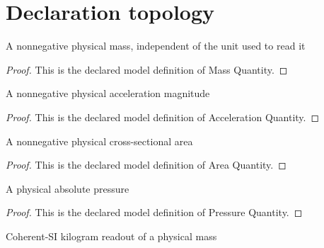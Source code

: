 \section{Declaration topology}
\begin{definition}
  \label{def:physics:phyx-mini-0384:phyxminiproblems-problemphyxmini0384-massquantity}
  A nonnegative physical mass, independent of the unit used to read it
\end{definition}
\begin{proof}
  This is the declared model definition of Mass Quantity.
\end{proof}
\begin{definition}
  \label{def:physics:phyx-mini-0384:phyxminiproblems-problemphyxmini0384-accelerationquantity}
  A nonnegative physical acceleration magnitude
\end{definition}
\begin{proof}
  This is the declared model definition of Acceleration Quantity.
\end{proof}
\begin{definition}
  \label{def:physics:phyx-mini-0384:phyxminiproblems-problemphyxmini0384-areaquantity}
  A nonnegative physical cross-sectional area
\end{definition}
\begin{proof}
  This is the declared model definition of Area Quantity.
\end{proof}
\begin{definition}
  \label{def:physics:phyx-mini-0384:phyxminiproblems-problemphyxmini0384-pressurequantity}
  A physical absolute pressure
\end{definition}
\begin{proof}
  This is the declared model definition of Pressure Quantity.
\end{proof}
\begin{definition}
  \label{def:physics:phyx-mini-0384:phyxminiproblems-problemphyxmini0384-massinkilograms}
  Coherent-SI kilogram readout of a physical mass
\end{definition}
